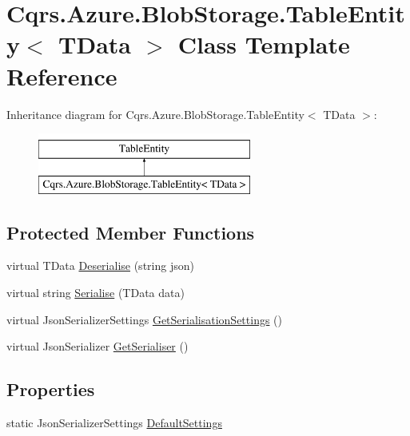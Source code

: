 \hypertarget{classCqrs_1_1Azure_1_1BlobStorage_1_1TableEntity}{}\section{Cqrs.\+Azure.\+Blob\+Storage.\+Table\+Entity$<$ T\+Data $>$ Class Template Reference}
\label{classCqrs_1_1Azure_1_1BlobStorage_1_1TableEntity}
Inheritance diagram for Cqrs.\+Azure.\+Blob\+Storage.\+Table\+Entity$<$ T\+Data $>$\+:\begin{figure}[H]
\begin{center}
\leavevmode
\includegraphics[height=2.000000cm]{classCqrs_1_1Azure_1_1BlobStorage_1_1TableEntity}
\end{center}
\end{figure}
\subsection*{Protected Member Functions}
\begin{DoxyCompactItemize}
\item 
virtual T\+Data \hyperlink{classCqrs_1_1Azure_1_1BlobStorage_1_1TableEntity_a5a5b53a3a2427a368f2ebe404f04f4ff_a5a5b53a3a2427a368f2ebe404f04f4ff}{Deserialise} (string json)
\item 
virtual string \hyperlink{classCqrs_1_1Azure_1_1BlobStorage_1_1TableEntity_af7467b1194756dd32029dc40f690c4ad_af7467b1194756dd32029dc40f690c4ad}{Serialise} (T\+Data data)
\item 
virtual Json\+Serializer\+Settings \hyperlink{classCqrs_1_1Azure_1_1BlobStorage_1_1TableEntity_aa36736f412df5a1667d7b0e5c0bd3035_aa36736f412df5a1667d7b0e5c0bd3035}{Get\+Serialisation\+Settings} ()
\item 
virtual Json\+Serializer \hyperlink{classCqrs_1_1Azure_1_1BlobStorage_1_1TableEntity_a18d1b7ecf408a921cd0e2e6a8d0f6c74_a18d1b7ecf408a921cd0e2e6a8d0f6c74}{Get\+Serialiser} ()
\end{DoxyCompactItemize}
\subsection*{Properties}
\begin{DoxyCompactItemize}
\item 
static Json\+Serializer\+Settings \hyperlink{classCqrs_1_1Azure_1_1BlobStorage_1_1TableEntity_ab7a9041c7d8e5237cfb81ad98b6b3980_ab7a9041c7d8e5237cfb81ad98b6b3980}{Default\+Settings}
\end{DoxyCompactItemize}


